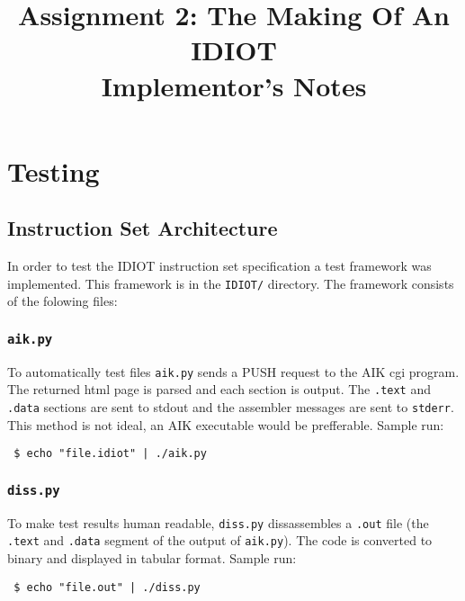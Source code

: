 \documentclass[conference]{IEEEtran}
\begin{document}
\title{Assignment 2: The Making Of An IDIOT\\Implementor's Notes}
\author{
        }

\maketitle

\begin{abstract}
\end{abstract}

\section{Testing}
\subsection{Instruction Set Architecture}
In order to test the IDIOT instruction set specification a test framework was
implemented. This framework is in the \texttt{IDIOT/} directory. The framework
consists of the folowing files:
\subsubsection{\texttt{aik.py}}
To automatically test files \texttt{aik.py} sends a PUSH request to the
AIK cgi program. The returned html page is parsed and each section is output.
The \texttt{.text} and \texttt{.data} sections are sent to stdout and the
assembler messages are sent to \texttt{stderr}. This method is not ideal, an
AIK executable would be prefferable. Sample run:
\begin{verbatim}
 $ echo "file.idiot" | ./aik.py
\end{verbatim}
\subsubsection{\texttt{diss.py}}
To make test results human readable, \texttt{diss.py} dissassembles a 
\texttt{.out} file (the \texttt{.text} and \texttt{.data} segment of the 
output of \texttt{aik.py}). The code is converted to binary and displayed in
tabular format. Sample run:
\begin{verbatim}
 $ echo "file.out" | ./diss.py
\end{verbatim}
\end{document}
